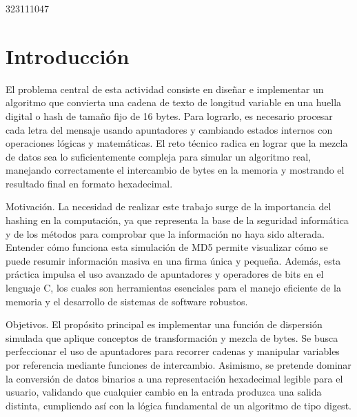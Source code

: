 323111047

\section{Introducción}

El problema central de esta actividad consiste en diseñar e implementar un algoritmo que convierta una cadena de texto de longitud variable en una huella digital o hash de tamaño fijo de 16 bytes. Para lograrlo, es necesario procesar cada letra del mensaje usando apuntadores y cambiando estados internos con operaciones lógicas y matemáticas. El reto técnico radica en lograr que la mezcla de datos sea lo suficientemente compleja para simular un algoritmo real, manejando correctamente el intercambio de bytes en la memoria y mostrando el resultado final en formato hexadecimal.

\vspace{0.4cm}

Motivación. La necesidad de realizar este trabajo surge de la importancia del hashing en la computación, ya que representa la base de la seguridad informática y de los métodos para comprobar que la información no haya sido alterada. Entender cómo funciona esta simulación de MD5 permite visualizar cómo se puede resumir información masiva en una firma única y pequeña. Además, esta práctica impulsa el uso avanzado de apuntadores y operadores de bits en el lenguaje C, los cuales son herramientas esenciales para el manejo eficiente de la memoria y el desarrollo de sistemas de software robustos.

\vspace{0.4cm}

Objetivos. El propósito principal es implementar una función de dispersión simulada que aplique conceptos de transformación y mezcla de bytes. Se busca perfeccionar el uso de apuntadores para recorrer cadenas y manipular variables por referencia mediante funciones de intercambio. Asimismo, se pretende dominar la conversión de datos binarios a una representación hexadecimal legible para el usuario, validando que cualquier cambio en la entrada produzca una salida distinta, cumpliendo así con la lógica fundamental de un algoritmo de tipo digest.